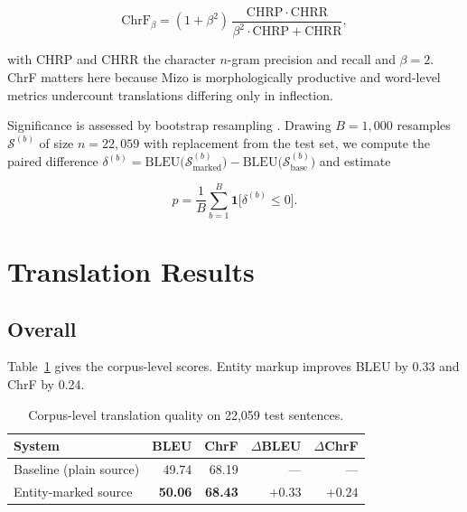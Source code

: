 \documentclass[acmsmall,screen,review]{acmart}
\begin{document}
\begin{equation}
\label{eq:chrf}
\mathrm{ChrF}_\beta =
(1 + \beta^{2}) \,
\frac{\mathrm{CHRP} \cdot \mathrm{CHRR}}
     {\beta^{2} \cdot \mathrm{CHRP} + \mathrm{CHRR}},
\end{equation}

with $\mathrm{CHRP}$ and $\mathrm{CHRR}$ the character $n$-gram precision and
recall and $\beta = 2$. ChrF matters here because Mizo is morphologically
productive and word-level metrics undercount translations differing only in
inflection.

Significance is assessed by bootstrap resampling \citep{koehn2004significance}.
Drawing $B = 1{,}000$ resamples $\mathcal{S}^{(b)}$ of size $n = 22{,}059$ with
replacement from the test set, we compute the paired difference
$\delta^{(b)} = \mathrm{BLEU}\bigl(\mathcal{S}^{(b)}_{\mathrm{marked}}\bigr) -
\mathrm{BLEU}\bigl(\mathcal{S}^{(b)}_{\mathrm{base}}\bigr)$
and estimate

\begin{equation}
\label{eq:bootstrap}
\hat{p} = \frac{1}{B} \sum_{b=1}^{B} \mathbf{1}\bigl[\delta^{(b)} \leq 0\bigr].
\end{equation}

\section{Translation Results}
\label{sec:mtresults}

\subsection{Overall}
\label{sec:mtresults:overall}

Table~\ref{tab:mt_overall} gives the corpus-level scores. Entity markup improves
BLEU by 0.33 and ChrF by 0.24.

\begin{table}[htbp]
\centering
\caption{Corpus-level translation quality on 22,059 test sentences.}
\label{tab:mt_overall}
\begin{tabular}{lrrrr}
\hline
\textbf{System} & \textbf{BLEU} & \textbf{ChrF} & \textbf{$\Delta$BLEU} & \textbf{$\Delta$ChrF} \\
\hline
Baseline (plain source) & 49.74 & 68.19 & --- & --- \\
Entity-marked source    & \textbf{50.06} & \textbf{68.43} & $+0.33$ & $+0.24$ \\
\hline
\end{tabular}
\end{table}
\end{document}
